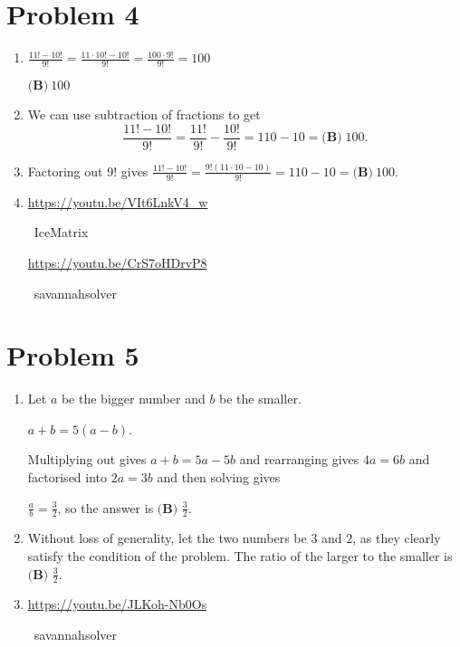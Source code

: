 \documentclass{article}%
\begin{document}
%
\section*{Problem 4}%
\label{sec:Problem4}%
\begin{enumerate}%
\item%
$\frac{11!-10!}{9!}=\frac{11\cdot10!-10!}{9!}=\frac{100\cdot9!}{9!}=100$


$\boxed{\textbf{(B)}~100}$

%
\item%
We can use subtraction of fractions to get \[\frac{11!-10!}{9!} = \frac{11!}{9!} - \frac{10!}{9!} = 110 -10 = \boxed{\textbf{(B)}\;100}.\]



%
\item%
Factoring out $9!$ gives $\frac{11!-10!}{9!} = \frac{9!(11 \cdot 10 - 10)}{9!} = 110-10=\boxed{\textbf{(B)}~100}$.

%
\item%
\href{https://youtu.be/VIt6LnkV4_w}{https://youtu.be/VIt6LnkV4\_w}

~IceMatrix

\href{https://youtu.be/CrS7oHDrvP8}{https://youtu.be/CrS7oHDrvP8}

~savannahsolver

%
\end{enumerate}

%
\section*{Problem 5}%
\label{sec:Problem5}%
\begin{enumerate}%
\item%
Let $a$ be the bigger number and $b$ be the smaller.

$a + b = 5(a - b)$.

Multiplying out gives $a + b = 5a - 5b$ and rearranging gives $4a = 6b$ and factorised into $2a = 3b$ and then solving gives

$\frac{a}{b} = \frac32$, so the answer is $\boxed{\textbf{(B) }\frac32}$.

%
\item%
Without loss of generality, let the two numbers be $3$ and $2$, as they clearly satisfy the condition of the problem. The ratio of the larger to the smaller is $\boxed{\textbf{(B) }\frac32}$.

%
\item%
\href{https://youtu.be/JLKoh-Nb0Os}{https://youtu.be/JLKoh-Nb0Os}

~savannahsolver

%
\end{enumerate}
\end{document}
